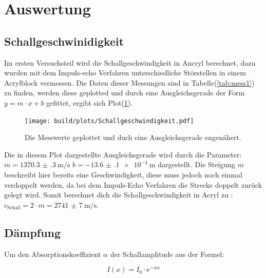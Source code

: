 \section{Auswertung}

    \subsection{Schallgeschwinidigkeit}

        \noindent Im ersten Versuchsteil wird die Schallgeschwindigkeit in Ancryl berechnet, dazu wurden mit dem Impuls-echo Verfahren 
        unterschiedliche Störstellen in einem Acrylblock vermessen. Die Daten dieser Messungen sind in Tabelle(\ref{tab:mess1}) zu finden, werden 
        diese geplotted und durch eine Ausgleichsgerade der Form $y = m \cdot x + b$ gefittet, ergibt sich Plot(\ref{img:py_sch}).

        \begin{figure}[ht]
            \centering
            \texttt{[image: build/plots/Schallgeschwindigkeit.pdf]}
            \caption{Die Messwerte geplottet und duch eine Ausgleichsgerade engenähert.}
            \label{img:py_sch}
        \end{figure}

        \noindent Die in diesem Plot dargestellte Ausgleichsgerade wird durch die Parameter: \newline
        $m = \SI{1370.3(3)}{\metre\per\second}$ \newline
        $b = \SI{-13.6(1)e-4}{\metre}$          \newline
        dargestellt. Die Steigung $m$ beschreibt hier bereits eine Geschwindigkeit, diese muss jedoch noch einmal verdoppelt werden, da bei dem 
        Impuls-Echo Verfahren die Strecke doppelt zurück gelegt wird. Somit berechnet dich die Schallgeschwindigkeit in Acryl zu : \newline
        $c_{\text{Schall}} = 2 \cdot m = \SI{2741(7)}{\metre\per\second}$.
        
    \subsection{Dämpfung}

        \noindent Um den Absorptionskoeffizient $\alpha$ der Schallamplitude aus der Formel:

        \begin{equation*}
            I(x) = I_0 \cdot \text{e}^{-\alpha x}
        \end{equation*}

